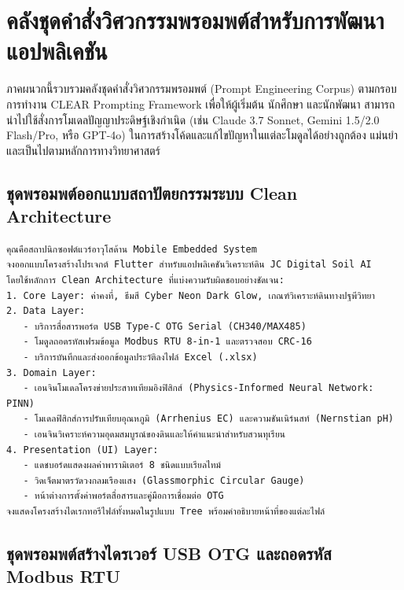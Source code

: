 \chapter{คลังชุดคำสั่งวิศวกรรมพรอมพต์สำหรับการพัฒนาแอปพลิเคชัน}
\label{app:prompts}

ภาคผนวกนี้รวบรวมคลังชุดคำสั่งวิศวกรรมพรอมพต์ (Prompt Engineering Corpus) ตามกรอบการทำงาน CLEAR Prompting Framework เพื่อให้ผู้เริ่มต้น นักศึกษา และนักพัฒนา สามารถนำไปใช้สั่งการโมเดลปัญญาประดิษฐ์เชิงกำเนิด (เช่น Claude 3.7 Sonnet, Gemini 1.5/2.0 Flash/Pro, หรือ GPT-4o) ในการสร้างโค้ดและแก้ไขปัญหาในแต่ละโมดูลได้อย่างถูกต้อง แม่นยำ และเป็นไปตามหลักการทางวิทยาศาสตร์

\section{ชุดพรอมพต์ออกแบบสถาปัตยกรรมระบบ Clean Architecture}

\begin{promptbox}[title={พรอมพต์ ก.1: การวางโครงสร้างโปรเจกต์ Flutter Clean Architecture}]
\begin{lstlisting}
คุณคือสถาปนิกซอฟต์แวร์อาวุโสด้าน Mobile Embedded System
จงออกแบบโครงสร้างโปรเจกต์ Flutter สำหรับแอปพลิเคชันวิเคราะห์ดิน JC Digital Soil AI 
โดยใช้หลักการ Clean Architecture ที่แบ่งความรับผิดชอบอย่างชัดเจน:
1. Core Layer: ค่าคงที่, ธีมสี Cyber Neon Dark Glow, เกณฑ์วิเคราะห์ดินทางปฐพีวิทยา
2. Data Layer:
   - บริการสื่อสารพอร์ต USB Type-C OTG Serial (CH340/MAX485)
   - โมดูลถอดรหัสเฟรมข้อมูล Modbus RTU 8-in-1 และตรวจสอบ CRC-16
   - บริการบันทึกและส่งออกข้อมูลประวัติลงไฟล์ Excel (.xlsx)
3. Domain Layer:
   - เอนจินโมเดลโครงข่ายประสาทเทียมอิงฟิสิกส์ (Physics-Informed Neural Network: PINN)
   - โมเดลฟิสิกส์การปรับเทียบอุณหภูมิ (Arrhenius EC) และความชันเนิร์นสท์ (Nernstian pH)
   - เอนจินวิเคราะห์ความอุดมสมบูรณ์ของดินและให้คำแนะนำสำหรับสวนทุเรียน
4. Presentation (UI) Layer:
   - แดชบอร์ดแสดงผลค่าพารามิเตอร์ 8 ชนิดแบบเรียลไทม์
   - วิดเจ็ตมาตรวัดวงกลมเรืองแสง (Glassmorphic Circular Gauge)
   - หน้าต่างการตั้งค่าพอร์ตสื่อสารและคู่มือการเชื่อมต่อ OTG
จงแสดงโครงสร้างไดเรกทอรีไฟล์ทั้งหมดในรูปแบบ Tree พร้อมคำอธิบายหน้าที่ของแต่ละไฟล์
\end{lstlisting}
\end{promptbox}

\section{ชุดพรอมพต์สร้างไดรเวอร์ USB OTG และถอดรหัส Modbus RTU}


